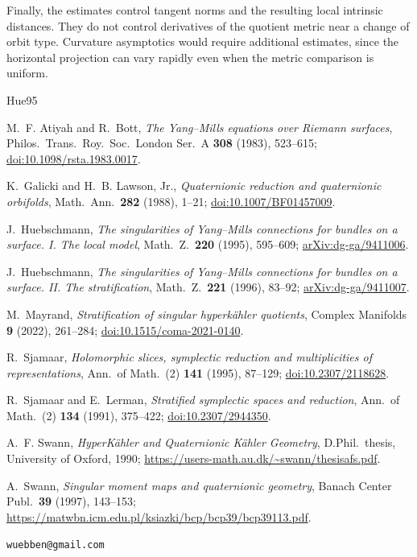 \documentclass[11pt]{amsart}
\theoremstyle{definition}
\theoremstyle{remark}
\begin{document}
Finally, the estimates control tangent norms and the resulting
local intrinsic distances. They do not control derivatives of
the quotient metric near a change of orbit type. Curvature
asymptotics would require additional estimates, since the
horizontal projection can vary rapidly even when the metric
comparison is uniform.

\begin{thebibliography}{Hue95}

M.~F. Atiyah and R.~Bott,
\emph{The Yang--Mills equations over Riemann surfaces},
Philos.\ Trans.\ Roy.\ Soc.\ London Ser.\ A \textbf{308} (1983), 523--615;
\href{https://doi.org/10.1098/rsta.1983.0017}{doi:10.1098/rsta.1983.0017}.

K.~Galicki and H.~B. Lawson, Jr.,
\emph{Quaternionic reduction and quaternionic orbifolds},
Math.\ Ann.\ \textbf{282} (1988), 1--21;
\href{https://doi.org/10.1007/BF01457009}{doi:10.1007/BF01457009}.

J.~Huebschmann,
\emph{The singularities of Yang--Mills connections for bundles on a
surface. I. The local model},
Math.\ Z.\ \textbf{220} (1995), 595--609;
\href{https://arxiv.org/abs/dg-ga/9411006}{arXiv:dg-ga/9411006}.

J.~Huebschmann,
\emph{The singularities of Yang--Mills connections for bundles on a
surface. II. The stratification},
Math.\ Z.\ \textbf{221} (1996), 83--92;
\href{https://arxiv.org/abs/dg-ga/9411007}{arXiv:dg-ga/9411007}.

M.~Mayrand,
\emph{Stratification of singular hyperkähler quotients},
Complex Manifolds \textbf{9} (2022), 261--284;
\href{https://doi.org/10.1515/coma-2021-0140}{doi:10.1515/coma-2021-0140}.

R.~Sjamaar,
\emph{Holomorphic slices, symplectic reduction and multiplicities of
representations},
Ann.\ of Math.\ (2) \textbf{141} (1995), 87--129;
\href{https://doi.org/10.2307/2118628}{doi:10.2307/2118628}.

R.~Sjamaar and E.~Lerman,
\emph{Stratified symplectic spaces and reduction},
Ann.\ of Math.\ (2) \textbf{134} (1991), 375--422;
\href{https://doi.org/10.2307/2944350}{doi:10.2307/2944350}.

A.~F. Swann,
\emph{HyperKähler and Quaternionic Kähler Geometry},
D.Phil.\ thesis, University of Oxford, 1990;
\url{https://users-math.au.dk/~swann/thesisafs.pdf}.

A.~Swann,
\emph{Singular moment maps and quaternionic geometry},
Banach Center Publ.\ \textbf{39} (1997), 143--153;
\url{https://matwbn.icm.edu.pl/ksiazki/bcp/bcp39/bcp39113.pdf}.

\end{thebibliography}

\bigskip
{}
\texttt{wuebben@gmail.com}
\end{document}
